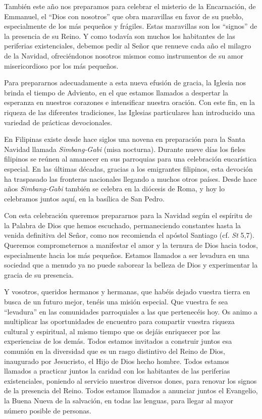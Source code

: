 También este año nos preparamos para celebrar el misterio de la
Encarnación, de Emmanuel, el ``Dios con nosotros'' que obra maravillas
en favor de su pueblo, especialmente de los más pequeños y frágiles.
Estas maravillas son los ``signos'' de la presencia de su Reino. Y como
todavía son muchos los habitantes de las periferias existenciales,
debemos pedir al Señor que renueve cada año el milagro de la Navidad,
ofreciéndonos nosotros mismos como instrumentos de su amor
misericordioso por los más pequeños.

Para prepararnos adecuadamente a esta nueva efusión de gracia, la
Iglesia nos brinda el tiempo de Adviento, en el que estamos llamados a
despertar la esperanza en nuestros corazones e intensificar nuestra
oración. Con este fin, en la riqueza de las diferentes tradiciones, las
Iglesias particulares han introducido una variedad de prácticas
devocionales.

En Filipinas existe desde hace siglos una novena en preparación para la
Santa Navidad llamada \emph{Simbang-Gabi} (misa nocturna). Durante nueve
días los fieles filipinos se reúnen al amanecer en sus parroquias para
una celebración eucarística especial. En las últimas décadas, gracias a
los emigrantes filipinos, esta devoción ha traspasado las fronteras
nacionales llegando a muchos otros países. Desde hace años
\emph{Simbang-Gabi} también se celebra en la diócesis de Roma, y hoy lo
celebramos juntos aquí, en la basílica de San Pedro.

Con esta celebración queremos prepararnos para la Navidad según el
espíritu de la Palabra de Dios que hemos escuchado, permaneciendo
constantes hasta la venida definitiva del Señor, como nos recomienda el
apóstol Santiago (cf. \emph{St} 5,7). Queremos comprometernos a
manifestar el amor y la ternura de Dios hacia todos, especialmente hacia
los más pequeños. Estamos llamados a ser levadura en una sociedad que a
menudo ya no puede saborear la belleza de Dios y experimentar la gracia
de su presencia.

Y vosotros, queridos hermanos y hermanas, que habéis dejado vuestra
tierra en busca de un futuro mejor, tenéis una misión especial. Que
vuestra fe sea ``levadura'' en las comunidades parroquiales a las que
pertenecéis hoy. Os animo a multiplicar las oportunidades de encuentro
para compartir vuestra riqueza cultural y espiritual, al mismo tiempo
que os dejáis enriquecer por las experiencias de los demás. Todos
estamos invitados a construir juntos esa comunión en la diversidad que
es un rasgo distintivo del Reino de Dios, inaugurado por Jesucristo, el
Hijo de Dios hecho hombre. Todos estamos llamados a practicar juntos la
caridad con los habitantes de las periferias existenciales, poniendo al
servicio nuestros diversos dones, para renovar los signos de la
presencia del Reino. Todos estamos llamados a anunciar juntos el
Evangelio, la Buena Nueva de la salvación, en todas las lenguas, para
llegar al mayor número posible de personas.

